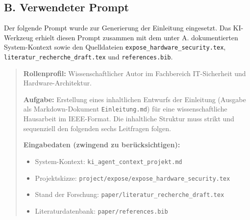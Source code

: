 \documentclass[conference]{IEEEtran}
\begin{document}
\bigskip
\subsection*{B. Verwendeter Prompt}

\noindent
Der folgende Prompt wurde zur Generierung der Einleitung eingesetzt.
Das KI-Werkzeug erhielt diesen Prompt zusammen mit dem unter A.
dokumentierten System-Kontext sowie den Quelldateien
\texttt{expose\_hardware\_security.tex},
\texttt{literatur\_recherche\_draft.tex} und \texttt{references.bib}.

\bigskip
\begin{quote}
\noindent\textbf{Rollenprofil:} Wissenschaftlicher Autor im Fachbereich
IT-Sicherheit und Hardware-Architektur.

\medskip
\noindent\textbf{Aufgabe:} Erstellung eines inhaltlichen Entwurfs der
Einleitung (Ausgabe als Markdown-Dokument \texttt{Einleitung.md}) für
eine wissenschaftliche Hausarbeit im IEEE-Format. Die inhaltliche
Struktur muss strikt und sequenziell den folgenden sechs Leitfragen
folgen.

\medskip
\noindent\textbf{Eingabedaten (zwingend zu berücksichtigen):}
\begin{itemize}
  \item System-Kontext: \texttt{ki\_agent\_context\_projekt.md}
  \item Projektskizze:
        \texttt{project/expose/expose\_hardware\_security.tex}
  \item Stand der Forschung:
        \texttt{paper/literatur\_recherche\_draft.tex}
  \item Literaturdatenbank: \texttt{paper/references.bib}
\end{itemize}


\end{quote}
\end{document}
